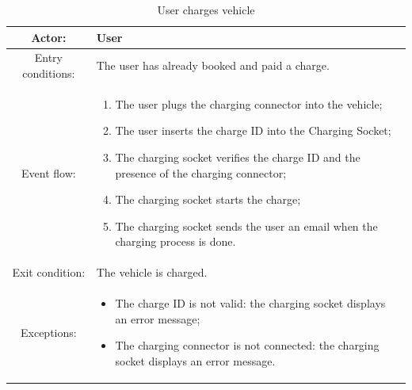 \begin{table}[h]
    \begin{center}
        \begin{tabular}{|c||p{10cm}|}
            \hline
            Actor:            & User                                           \\
            \hline
            Entry conditions: & The user has already booked and paid a charge. \\
            \hline
            Event flow:       &
            \begin{enumerate}
                \item The user plugs the charging connector into the vehicle;
                \item The user inserts the charge ID into the Charging Socket;
                \item The charging socket verifies the charge ID and the presence of the charging connector;
                \item The charging socket starts the charge;
                \item The charging socket sends the user an email when the charging process is done.
            \end{enumerate}
            \\
            \hline
            Exit condition:   & The vehicle is charged.                        \\
            \hline
            Exceptions:       &
            \begin{itemize}
                \item The charge ID is not valid: the charging socket displays an error message;
                \item The charging connector is not connected: the charging socket displays an error message.
            \end{itemize}
            \\
            \hline
        \end{tabular}
    \end{center}
    \caption{User charges vehicle}
\end{table}

